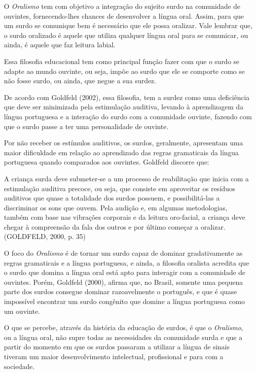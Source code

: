 \documentclass[brasil]{abnt}
\begin{document}
		 O \textit{Oralismo} tem com objetivo a integração do sujeito surdo na comunidade de ouvintes, fornecendo-lhes chances de desenvolver a língua oral. Assim, para que um surdo se comunique bem é 
		 necessário que ele possa oralizar. Vale lembrar que, o surdo oralizado é aquele que utiliza qualquer língua oral para se comunicar, ou ainda, é aquele que faz leitura labial.
		 
		 Essa filosofia educacional tem como principal função fazer com que o surdo se adapte ao mundo ouvinte, ou seja, impõe ao surdo que ele se comporte como se não fosse surdo, ou ainda, que negue a 
		 sua surdez.
		 
		 De acordo com Goldfeld (2002), essa filosofia, tem a surdez como uma deficiência que deve ser minimizada pela estimulação auditiva, levando à aprendizagem da língua portuguesa e a interação do surdo 
		 com a comunidade ouvinte, fazendo com que o surdo passe a ter uma personalidade de ouvinte.  
		 
		 Por não receber os estímulos auditivos, os surdos, geralmente, apresentam uma maior dificuldade em relação ao aprendizado das regras gramaticais da língua portuguesa quando comparados 
		 aos ouvintes. Goldfeld discorre que:
		 
			\begin{citacao} A criança surda deve submeter-se a um processo de reabilitação que inicia com a estimulação auditiva precoce, ou seja, que consiste em aproveitar os resíduos auditivos que quase a 
							totalidade dos surdos possuem, e possibilitá-las a discriminar os sons que ouvem. Pela audição e, em algumas metodologias, também com base nas vibrações corporais e da leitura 
							oro-facial, a criança deve chegar à compreensão da fala dos outros e por último começar a oralizar. (GOLDFELD, 2000, p. 35) 
			\end{citacao}
		
		O foco do \textit{Oralismo} é de tornar um surdo capaz de dominar gradativamente as regras gramaticais e a língua portuguesa, e ainda, a filosofia oralista acredita que o surdo que domina a língua 
		oral está apto para interagir com a comunidade de ouvintes. Porém, Goldfeld (2000), afirma que, no Brasil, somente uma pequena parte dos surdos consegue dominar razoavelmente o português, e que é quase 
		impossível encontrar um surdo congênito que domine a língua portuguesa como um ouvinte.
		
		O que se percebe, através da história da educação de surdos, é que o \textit{Oralismo}, ou a língua oral, não supre todas as necessidades da comunidade surda e que a partir do momento em que os surdos 
		passaram a utilizar a língua de sinais tiveram um maior desenvolvimento intelectual, profissional e para com a sociedade.		 		 
		 
\end{document}
